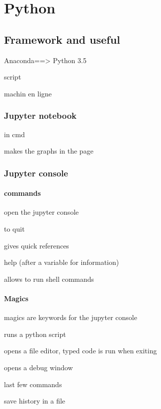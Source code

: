 
\chapter{Python}

\section{Framework and useful}

Anaconda==> Python 3.5

	 script

	 machin en ligne


	\subsection{Jupyter notebook}
		 in cmd

		 makes the graphs in the page

	\subsection{Jupyter console}


		\subsubsection{commands}
			
			 open the jupyter console

			 to quit

			 gives quick references

			 help (after a variable for information)

			 allows to run shell commands

		\subsubsection{Magics}

			magics are keywords for the jupyter console

			 runs a python script

			 opens a file editor, typed code is run when exiting

			 opens a debug window

			  last few commands

			 save history in a file

